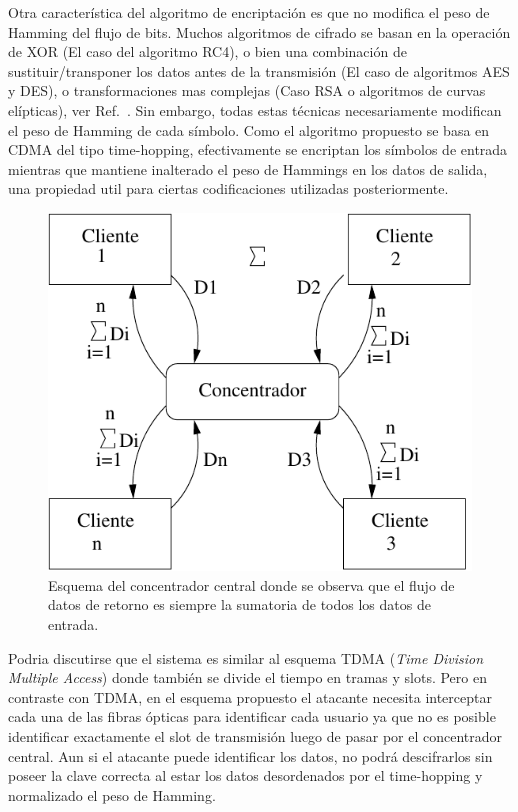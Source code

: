 Otra característica del algoritmo de encriptación es que no modifica el peso de Hamming del flujo de bits. Muchos algoritmos de cifrado se basan en la operación de XOR (El caso del algoritmo RC4), o bien una combinación de sustituir/transponer los datos antes de la transmisión (El caso de algoritmos AES y DES), o transformaciones mas complejas (Caso RSA o algoritmos de curvas elípticas), ver Ref.~\cite{Menezes:1996:HAC:548089}.
Sin embargo, todas estas técnicas necesariamente modifican el peso de Hamming de cada símbolo. %
Como el algoritmo propuesto se basa en CDMA del tipo time-hopping, efectivamente se encriptan los símbolos de entrada mientras que mantiene inalterado el peso de Hammings en los datos de salida, una propiedad util para ciertas codificaciones utilizadas posteriormente. %

\begin{figure}[t]
  \centering
  \includegraphics[width=0.6 \textwidth]{graphs/concentrador} 
  \caption{Esquema del concentrador central donde se observa que el flujo de datos de retorno es siempre la sumatoria de todos los datos de entrada.}
  \label{fig_use}
\end{figure}

Podria discutirse que el sistema es similar al esquema TDMA (\textit{Time Division Multiple Access}) donde también se divide el tiempo en tramas y slots. Pero en contraste con TDMA, en el esquema propuesto el atacante necesita interceptar cada una de las fibras ópticas para identificar cada usuario ya que no es posible identificar exactamente el slot de transmisión luego de pasar por el concentrador central. Aun si el atacante puede identificar los datos, no podrá descifrarlos sin poseer la clave correcta al estar los datos desordenados por el time-hopping y normalizado el peso de Hamming.

